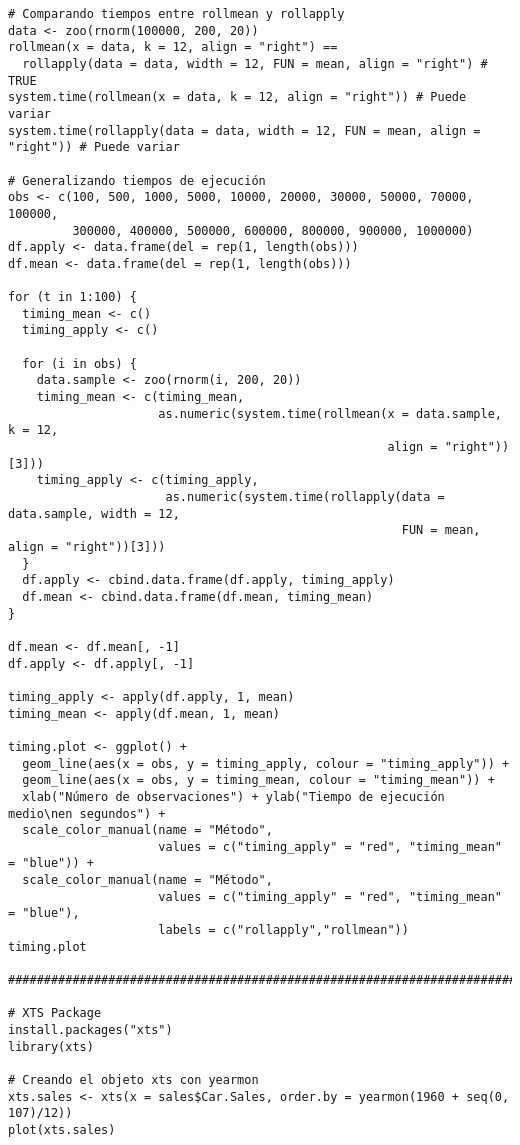 \documentclass[12pt,a4paper,oneside]{article}
\begin{document}
\begin{Verbatim}[fontsize=\footnotesize]
# Comparando tiempos entre rollmean y rollapply
data <- zoo(rnorm(100000, 200, 20))
rollmean(x = data, k = 12, align = "right") ==
  rollapply(data = data, width = 12, FUN = mean, align = "right") # TRUE
system.time(rollmean(x = data, k = 12, align = "right")) # Puede variar
system.time(rollapply(data = data, width = 12, FUN = mean, align = "right")) # Puede variar

# Generalizando tiempos de ejecución
obs <- c(100, 500, 1000, 5000, 10000, 20000, 30000, 50000, 70000, 100000,
         300000, 400000, 500000, 600000, 800000, 900000, 1000000)
df.apply <- data.frame(del = rep(1, length(obs)))
df.mean <- data.frame(del = rep(1, length(obs)))

for (t in 1:100) {
  timing_mean <- c()
  timing_apply <- c()

  for (i in obs) {
    data.sample <- zoo(rnorm(i, 200, 20))
    timing_mean <- c(timing_mean,
                     as.numeric(system.time(rollmean(x = data.sample, k = 12,
                                                     align = "right"))[3]))
    timing_apply <- c(timing_apply,
                      as.numeric(system.time(rollapply(data = data.sample, width = 12,
                                                       FUN = mean, align = "right"))[3]))
  }
  df.apply <- cbind.data.frame(df.apply, timing_apply)
  df.mean <- cbind.data.frame(df.mean, timing_mean)
}

df.mean <- df.mean[, -1]
df.apply <- df.apply[, -1]

timing_apply <- apply(df.apply, 1, mean)
timing_mean <- apply(df.mean, 1, mean)

timing.plot <- ggplot() +
  geom_line(aes(x = obs, y = timing_apply, colour = "timing_apply")) +
  geom_line(aes(x = obs, y = timing_mean, colour = "timing_mean")) +
  xlab("Número de observaciones") + ylab("Tiempo de ejecución medio\nen segundos") +
  scale_color_manual(name = "Método",
                     values = c("timing_apply" = "red", "timing_mean" = "blue")) +
  scale_color_manual(name = "Método",
                     values = c("timing_apply" = "red", "timing_mean" = "blue"),
                     labels = c("rollapply","rollmean"))
timing.plot

#######################################################################################

# XTS Package
install.packages("xts")
library(xts)

# Creando el objeto xts con yearmon
xts.sales <- xts(x = sales$Car.Sales, order.by = yearmon(1960 + seq(0, 107)/12))
plot(xts.sales)


\end{Verbatim}
\end{document}
